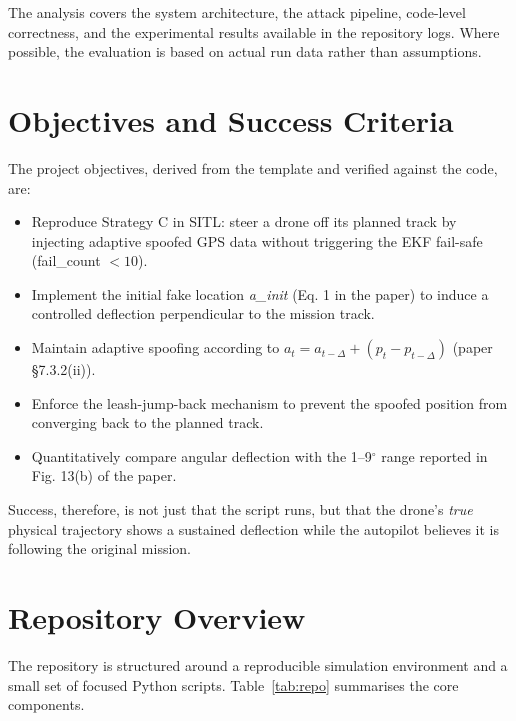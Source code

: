 \documentclass[12pt, a4paper]{article}
\begin{document}
The analysis covers the system architecture, the attack pipeline, code-level correctness, and the experimental results available in the repository logs. Where possible, the evaluation is based on actual run data rather than assumptions.

\section{Objectives and Success Criteria}

The project objectives, derived from the template and verified against the code, are:

\begin{itemize}[noitemsep]
  \item Reproduce Strategy C in SITL: steer a drone off its planned track by injecting adaptive spoofed GPS data without triggering the EKF fail-safe (fail\_count $< 10$).
  \item Implement the initial fake location \textit{a\_init} (Eq. 1 in the paper) to induce a controlled deflection perpendicular to the mission track.
  \item Maintain adaptive spoofing according to $a_t = a_{t-\Delta} + (p_t - p_{t-\Delta})$ (paper \S7.3.2(ii)).
  \item Enforce the leash-jump-back mechanism to prevent the spoofed position from converging back to the planned track.
  \item Quantitatively compare angular deflection with the 1--9$^\circ$ range reported in Fig. 13(b) of the paper.
\end{itemize}

Success, therefore, is not just that the script runs, but that the drone's \textit{true} physical trajectory shows a sustained deflection while the autopilot believes it is following the original mission.

\section{Repository Overview}

The repository is structured around a reproducible simulation environment and a small set of focused Python scripts. Table~\ref{tab:repo} summarises the core components.
\end{document}
